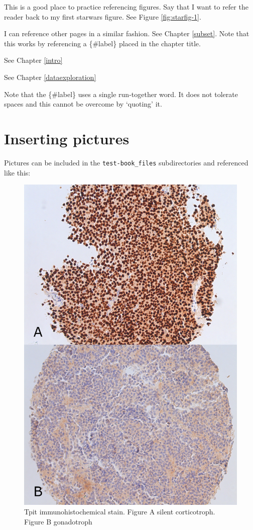 \documentclass[]{book}
\begin{document}
This is a good place to practice referencing figures. Say that I want to refer the reader back to my first starwars figure. See Figure \ref{fig:starfig-1}.

I can reference other pages in a similar fashion. See Chapter \ref{subset}. Note that this works by referencing a \{\#label\} placed in the chapter title.

See Chapter \ref{intro}

See Chapter \ref{dataexploration}

Note that the \{\#label\} uses a single run-together word. It does not tolerate spaces and this cannot be overcome by `quoting' it.

\hypertarget{inserting-pictures}{%
\section{Inserting pictures}\label{inserting-pictures}}

Pictures can be included in the \texttt{test-book\_files} subdirectories and referenced like this:

\begin{figure}
\centering
\includegraphics{_bookdown_files/pathologyImages/TpitIHC.jpg}
\caption{Tpit immunohistochemical stain. Figure A silent corticotroph. Figure B gonadotroph}
\end{figure}
\end{document}
